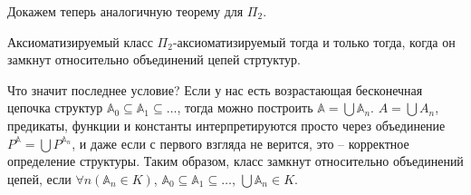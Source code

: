 Докажем теперь аналогичную теорему для $\Pi_2$.  \\ 

\begin{theorem}
    Аксиоматизируемый класс $\Pi_2$-аксиоматизируемый тогда и только тогда, когда он замкнут относительно объединений цепей стртуктур.
\end{theorem}

\begin{remark}
    Что значит последнее условие? Если у нас есть возрастающая бесконечная цепочка структур $\mathbb{A}_0 \subseteq \mathbb{A}_1 \subseteq \ldots$, тогда можно построить $\mathbb{A} = \bigcup \mathbb{A}_n$. $A = \bigcup A_n$, предикаты, функции  и константы интерпретируются просто через объединение $P^{\mathbb{A}} = \bigcup P^{\mathbb{A}_n}$, и даже если с первого взгляда не верится, это -- корректное определение структуры. Таким образом, класс замкнут относительно объединений цепей, если $\forall n (\mathbb{A}_n \in K)$, $\mathbb{A}_0 \subseteq \mathbb{A}_1 \subseteq \ldots$, $\bigcup \mathbb{A}_n \in K$. 
\end{remark}

